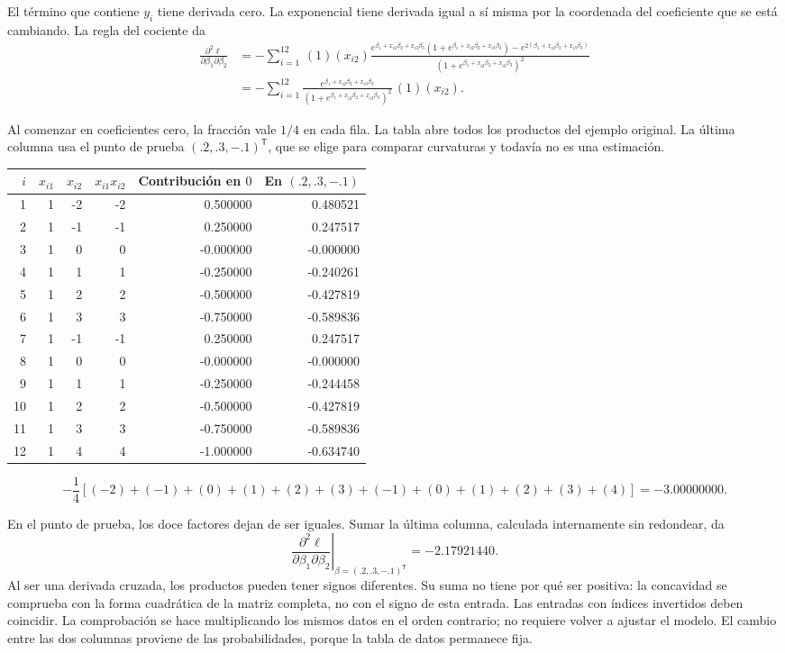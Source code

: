 \documentclass[11pt,a4paper]{article}
\newcommand{\T}{^{\mathsf T}}
\begin{document}
El término que contiene $y_i$ tiene derivada cero.
La exponencial tiene derivada igual a sí misma por la coordenada
del coeficiente que se está cambiando. La regla del cociente da
\[
\begin{aligned}
\frac{\partial^2\ell}{\partial\beta_1\partial\beta_2}&=-\sum_{i=1}^{12}\,(1)(x_{i2})\frac{e^{\beta_1+x_{i2}\beta_2+x_{i3}\beta_3}(1+e^{\beta_1+x_{i2}\beta_2+x_{i3}\beta_3})-e^{2(\beta_1+x_{i2}\beta_2+x_{i3}\beta_3)}}{(1+e^{\beta_1+x_{i2}\beta_2+x_{i3}\beta_3})^2}\\&=-\sum_{i=1}^{12}\frac{e^{\beta_1+x_{i2}\beta_2+x_{i3}\beta_3}}{(1+e^{\beta_1+x_{i2}\beta_2+x_{i3}\beta_3})^2}\,(1)(x_{i2}).\end{aligned}
\]

Al comenzar en coeficientes cero, la fracción vale $1/4$ en cada fila.
La tabla abre todos los productos del ejemplo original. La última
columna usa el punto de prueba $(.2,.3,-.1)^\mathsf T$, que se elige
para comparar curvaturas y todavía no es una estimación.
\begin{center}\small
\begin{tabular}{rrrrrr}
\toprule
$i$&$x_{i1}$&$x_{i2}$&$x_{i1}x_{i2}$&Contribución en $0$&En $(.2,.3,-.1)$\\\midrule1&1&-2&-2&0.500000&0.480521\\
2&1&-1&-1&0.250000&0.247517\\
3&1&0&0&-0.000000&-0.000000\\
4&1&1&1&-0.250000&-0.240261\\
5&1&2&2&-0.500000&-0.427819\\
6&1&3&3&-0.750000&-0.589836\\
7&1&-1&-1&0.250000&0.247517\\
8&1&0&0&-0.000000&-0.000000\\
9&1&1&1&-0.250000&-0.244458\\
10&1&2&2&-0.500000&-0.427819\\
11&1&3&3&-0.750000&-0.589836\\
12&1&4&4&-1.000000&-0.634740\\\bottomrule\end{tabular}\end{center}\[
-\frac14\left[(-2)+(-1)+(0)+(1)+(2)+(3)+(-1)+(0)+(1)+(2)+(3)+(4)\right]=-3.00000000.
\]

En el punto de prueba, los doce factores dejan de ser iguales.
Sumar la última columna, calculada internamente sin redondear, da
\[
\left.\frac{\partial^2\ell}{\partial\beta_1\partial\beta_2}\right|_{\beta=(.2,.3,-.1)\T}=-2.17921440.
\]
Al ser una derivada cruzada, los productos pueden tener signos diferentes. Su suma no tiene por qué ser positiva: la concavidad se comprueba con la forma cuadrática de la matriz completa, no con el signo de esta entrada.
Las entradas con índices invertidos deben coincidir.
La comprobación se hace multiplicando los mismos datos en el orden
contrario; no requiere volver a ajustar el modelo.
El cambio entre las dos columnas proviene de las probabilidades,
porque la tabla de datos permanece fija.
\end{document}
